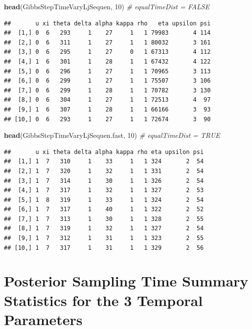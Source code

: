 \documentclass[
]{article}
\newenvironment{Shaded}{\begin{snugshade}}{\end{snugshade}}
\newcommand{\CommentTok}[1]{\textcolor[rgb]{0.56,0.35,0.01}{\textit{#1}}}
\newcommand{\DecValTok}[1]{\textcolor[rgb]{0.00,0.00,0.81}{#1}}
\newcommand{\FunctionTok}[1]{\textcolor[rgb]{0.13,0.29,0.53}{\textbf{#1}}}
\newcommand{\NormalTok}[1]{#1}
\begin{document}
\begin{Shaded}
\begin{Highlighting}[]
\FunctionTok{head}\NormalTok{(GibbsStepTimeVaryLjSequen, }\DecValTok{10}\NormalTok{)      }\CommentTok{\# equalTimeDist = FALSE}
\end{Highlighting}
\end{Shaded}

\begin{verbatim}
##       u xi theta delta alpha kappa rho   eta upsilon psi
##  [1,] 0  6   293     1    27     1   1 79983       4 114
##  [2,] 0  6   311     1    27     1   1 80032       3 161
##  [3,] 0  6   295     1    27     0   1 67313       4 112
##  [4,] 1  6   301     1    28     1   1 67432       4 122
##  [5,] 0  6   296     1    27     1   1 70965       3 113
##  [6,] 0  6   299     1    27     1   1 75507       3 106
##  [7,] 0  6   299     1    28     1   1 70782       3 130
##  [8,] 0  6   304     1    27     1   1 72513       4  97
##  [9,] 1  6   307     1    28     1   1 66166       3  93
## [10,] 0  6   293     1    27     1   1 72674       3  90
\end{verbatim}

\begin{Shaded}
\begin{Highlighting}[]
\FunctionTok{head}\NormalTok{(GibbsStepTimeVaryLjSequen.fast, }\DecValTok{10}\NormalTok{) }\CommentTok{\# equalTimeDist = TRUE}
\end{Highlighting}
\end{Shaded}

\begin{verbatim}
##       u xi theta delta alpha kappa rho eta upsilon psi
##  [1,] 1  7   310     1    33     1   1 324       2  54
##  [2,] 1  7   320     1    32     1   1 331       2  54
##  [3,] 1  7   314     1    30     1   1 326       2  54
##  [4,] 1  7   317     1    32     1   1 327       2  53
##  [5,] 1  8   319     1    33     1   1 324       2  54
##  [6,] 1  7   317     1    40     1   1 322       2  52
##  [7,] 1  7   313     1    30     1   1 328       2  55
##  [8,] 1  7   319     1    32     1   1 327       2  54
##  [9,] 1  7   312     1    31     1   1 323       2  55
## [10,] 1  7   317     1    31     1   1 329       2  56
\end{verbatim}

\hypertarget{posterior-sampling-time-summary-statistics-for-the-3-temporal-parameters}{%
\section{Posterior Sampling Time Summary Statistics for the 3 Temporal
Parameters}\label{posterior-sampling-time-summary-statistics-for-the-3-temporal-parameters}}
\end{document}
